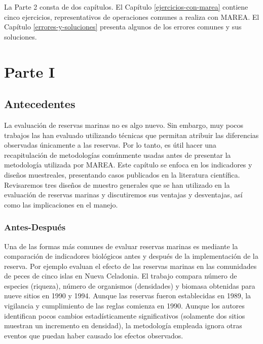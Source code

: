 \documentclass[]{krantz}
\begin{document}
La Parte 2 consta de dos capítulos. El Capítulo
\ref{ejercicios-con-marea} contiene cinco ejercicios, representativos de
operaciones comunes a realiza con MAREA. El Capítulo
\ref{errores-y-soluciones} presenta algunos de los errores comunes y sus
soluciones.

\mainmatter

\hypertarget{part-parte-i}{%
\part{Parte I}\label{part-parte-i}}

\hypertarget{antecedentes}{%
\chapter{Antecedentes}\label{antecedentes}}

La evaluación de reservas marinas no es algo nuevo. Sin embargo, muy
pocos trabajos las han evaluado utilizando técnicas que permitan
atribuir las diferencias observadas únicamente a las reservas. Por lo
tanto, es útil hacer una recapitulación de metodologías comúnmente
usadas antes de presentar la metodología utilizada por MAREA. Este
capítulo se enfoca en los indicadores y diseños muestreales, presentando
casos publicados en la literatura científica. Revisaremos tres diseños
de muestro generales que se han utilizado en la evaluación de reservas
marinas y discutiremos sus ventajas y desventajas, así como las
implicaciones en el manejo.

\hypertarget{antes-despues}{%
\section{Antes-Después}\label{antes-despues}}

Una de las formas más comunes de evaluar reservas marinas es mediante la
comparación de indicadores biológicos antes y después de la
implementación de la reserva. Por ejemplo \citet{wantiez_1997} evaluan
el efecto de las reservas marinas en las comunidades de peces de cinco
islas en Nueva Celadonia. El trabajo compara número de especies
(riqueza), número de organismos (densidades) y biomasa obtenidas para
nueve sitios en 1990 y 1994. Aunque las reservas fueron establecidas en
1989, la vigilancia y cumplimiento de las reglas comienza en 1990.
Aunque los autores identifican pocos cambios estadísticamente
significativos (solamente dos sitios muestran un incremento en
densidad), la metodología empleada ignora otras eventos que puedan haber
causado los efectos observados.
\end{document}
